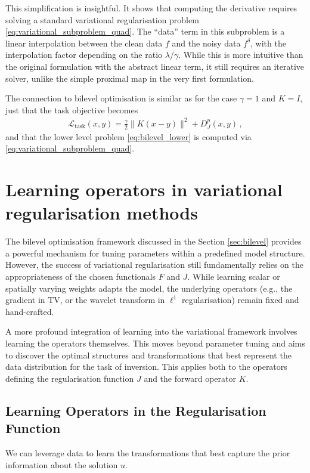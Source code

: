 \begin{rem}[Interpretation]\normalfont
This simplification is insightful. It shows that computing the derivative requires solving a standard variational regularisation problem \eqref{eq:variational_subproblem_quad}. The ``data'' term in this subproblem is a linear interpolation between the clean data $f$ and the noisy data $f^\delta$, with the interpolation factor depending on the ratio $\lambda/\gamma$. While this is more intuitive than the original formulation with the abstract linear term, it still requires an iterative solver, unlike the simple proximal map in the very first formulation.
\end{rem}

The connection to bilevel optimisation is similar as for the case $\gamma = 1$ and $K = I$, just that the task objective becomes 
\begin{align*}
    \mathcal{L}_{\text{task}}(x, y) = \frac{\gamma}{2} \| K(x - y) \|^2 + D_J^p(x, y) \, ,
\end{align*}
and that the lower level problem \eqref{eq:bilevel_lower} is computed via \eqref{eq:variational_subproblem_quad}.

\section{Learning operators in variational regularisation methods}

The bilevel optimisation framework discussed in the Section \ref{sec:bilevel} provides a powerful mechanism for tuning parameters within a predefined model structure. However, the success of variational regularisation still fundamentally relies on the appropriateness of the chosen functionals $F$ and $J$. While learning scalar or spatially varying weights adapts the model, the underlying operators (e.g., the gradient in TV, or the wavelet transform in $\ell^1$ regularisation) remain fixed and hand-crafted.

A more profound integration of learning into the variational framework involves learning the operators themselves. This moves beyond parameter tuning and aims to discover the optimal structures and transformations that best represent the data distribution for the task of inversion. This applies both to the operators defining the regularisation function $J$ and the forward operator $K$.

\subsection{Learning Operators in the Regularisation Function}
We can leverage data to learn the transformations that best capture the prior information about the solution $u$.

